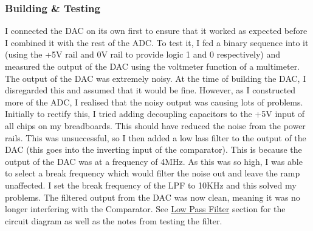 \subsubsection{Building \& Testing}
I connected the DAC on its own first to ensure that it worked as expected before I combined it with the rest of the ADC. To test it, I fed a binary sequence into it (using the +5V rail and 0V rail to provide logic 1 and 0 respectively) and measured the output of the DAC using the voltmeter function of a multimeter. \newline
The output of the DAC was extremely noisy. At the time of building the DAC, I disregarded this and assumed that it would be fine. However, as I constructed more of the ADC, I realised that the noisy output was causing lots of problems. Initially to rectify this, I tried adding decoupling capacitors to the +5V input of all chips on my breadboards. This should have reduced the noise from the power rails. This was unsuccessful, so I then added a low lass filter to the output of the DAC (this goes into the inverting input of the comparator). This is because the output of the DAC was at a frequency of 4MHz. As this was so high, I was able to select a break frequency which would filter the noise out and leave the ramp unaffected. I set the break frequency of the LPF to 10KHz and this solved my problems. The filtered output from the DAC was now clean, meaning it was no longer interfering with the Comparator. See \hyperref[sec:LPF]{Low Pass Filter} section for the circuit diagram as well as the notes from testing the filter.

